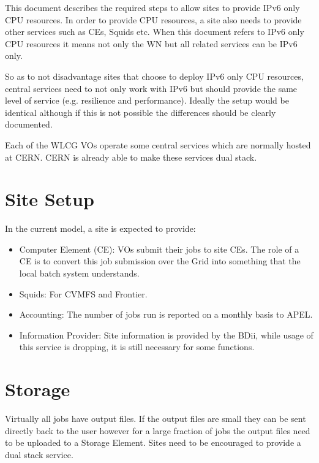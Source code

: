 This document describes the required steps to allow sites to provide IPv6 only CPU resources.  In order to provide CPU resources, a site also needs to provide other services such as CEs, Squids etc.  When this document refers to IPv6 only CPU resources it means not only the WN but all related services can be IPv6 only. 

So as to not disadvantage sites that choose to deploy IPv6 only CPU resources, central services need to not only work with IPv6 but should provide the same level of service (e.g. resilience and performance).  Ideally the setup would be identical although if this is not possible the differences should be clearly documented.

Each of the WLCG VOs operate some central services which are normally hosted at CERN.  CERN is already able to make these services dual stack.

\section{Site Setup}
In the current model, a site is expected to provide:

\begin{itemize}
\item Computer Element (CE): VOs submit their jobs to site CEs.  The role of a CE is to convert this job submission over the Grid into something that the local batch system understands.

\item Squids:  For CVMFS and Frontier.

\item Accounting: The number of jobs run is reported on a monthly basis to APEL.

\item Information Provider: Site information is provided by the BDii, while usage of this service is dropping, it is still necessary for some functions.

\end{itemize}


\section{Storage}
Virtually all jobs have output files.  If the output files are small they can be sent directly back to the user however for a large fraction of jobs the output files need to be uploaded to a Storage Element.  Sites need to be encouraged to provide a dual stack service.

